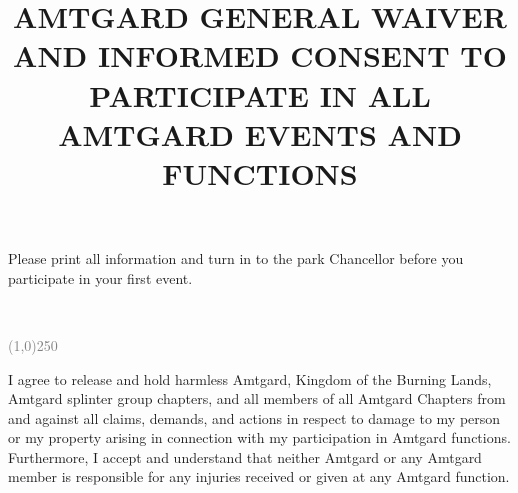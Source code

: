 \documentclass[nopagenumbers]{article}
\title{AMTGARD GENERAL WAIVER AND INFORMED CONSENT TO
PARTICIPATE IN ALL AMTGARD EVENTS AND FUNCTIONS}
\begin{document}


Please print all information and turn in to the park Chancellor before you participate in your first event.

\bigskip




\medskip



~
~


\medskip



\medskip







\bigskip

\begin{center}
	\textcolor{Gray}{\line(1,0){250}}
\end{center}

I agree to release and hold harmless Amtgard, Kingdom of the Burning Lands, Amtgard splinter group chapters, and all members of all Amtgard Chapters from and against all claims, demands, and actions in respect to damage to my person or my property arising in connection with my participation in Amtgard functions.
Furthermore, I accept and understand that neither Amtgard or any Amtgard member is responsible for any injuries received or given at any Amtgard function.

\bigskip


\smallskip


\smallskip

\end{document}
